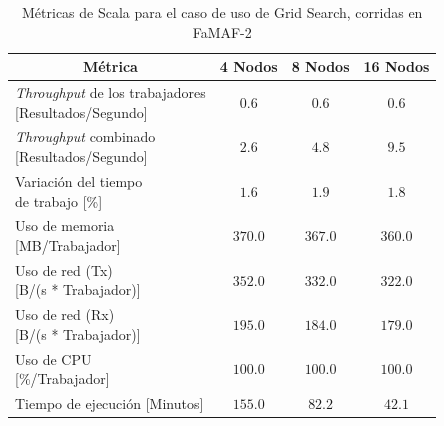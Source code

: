\documentclass[11pt]{article}
\providecommand{\row}[1]{\parbox{150pt}{\setlength{\baselineskip}{0.2\baselineskip}\strut#1\strut}}
\newcommand{\gscap}[2]{\caption{Métricas de #1 para el caso de uso de Grid Search, corridas en #2}}
\newcommand{\english}[1]{\textit{#1}}
\begin{document}
\begin{table}[H]
\centering
\begin{tabular}{|l|c|c|c|}
\hline
\multicolumn{1}{|c|}{Métrica} & 4 Nodos & 8 Nodos & 16 Nodos \\ \hline
\row{\english{Throughput} de los trabajadores\\{[Resultados/Segundo]}} & $0.6$ & $0.6$ & $0.6$ \\ \hline
\row{\english{Throughput} combinado\\{[Resultados/Segundo]}} & $2.6$ & $4.8$ & $9.5$ \\ \hline
\row{Variación del tiempo\\de trabajo {[\%]}} & $1.6$ & $1.9$ & $1.8$ \\ \hline
\row{Uso de memoria\\{[MB/Trabajador]}} & $370.0$ & $367.0$ & $360.0$ \\ \hline
\row{Uso de red (Tx)\\{[B/(s * Trabajador)]}} & $352.0$ & $332.0$ & $322.0$ \\ \hline
\row{Uso de red (Rx)\\{[B/(s * Trabajador)]}} & $195.0$ & $184.0$ & $179.0$ \\ \hline
\row{Uso de CPU\\{[\%/Trabajador]}} & $100.0$ & $100.0$ & $100.0$ \\ \hline
Tiempo de ejecución [Minutos] & $155.0$ & $82.2$ & $42.1$ \\ \hline
\end{tabular}
\gscap{Scala}{FaMAF-2}
\end{table}
\end{document}
